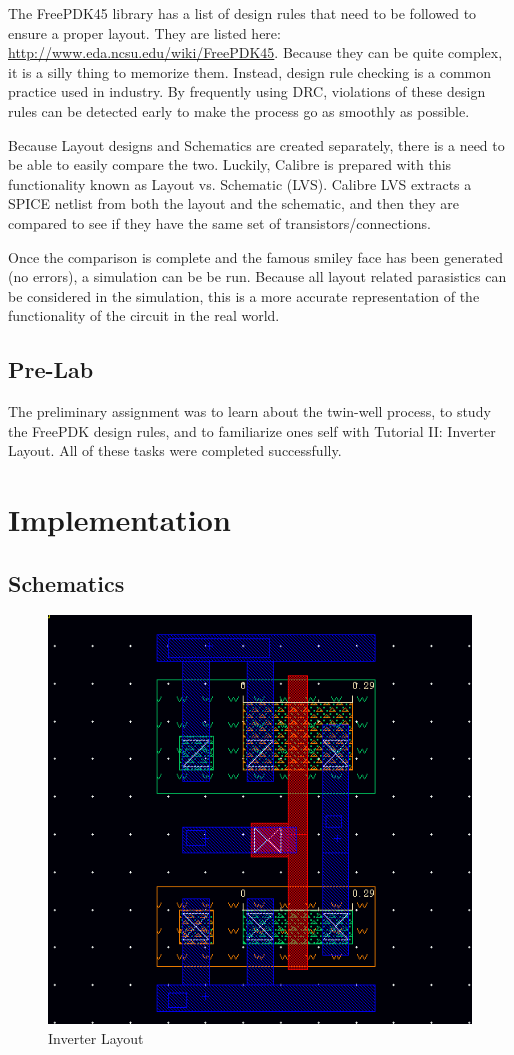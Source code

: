 \documentclass[12pt]{article}
\begin{document}
The FreePDK45 library has a list of design rules that need to be followed to ensure a proper layout. They are listed here: \url{http://www.eda.ncsu.edu/wiki/FreePDK45}. Because they can be quite complex, it is a silly thing to memorize them. Instead, design rule checking is a common practice used in industry. By frequently using DRC, violations of these design rules can be detected early to make the process go as smoothly as possible.

Because Layout designs and Schematics are created separately, there is a need to be able to easily compare the two. Luckily, Calibre is prepared with this functionality known as Layout vs. Schematic (LVS). Calibre LVS extracts a SPICE netlist from both the layout and the schematic, and then they are compared to see if they have the same set of transistors/connections.

Once the comparison is complete and the famous smiley face has been generated (no errors), a simulation can be be run. Because all layout related parasistics can be considered in the simulation, this is a more accurate representation of the functionality of the circuit in the real world. 
\subsection{Pre-Lab}
The preliminary assignment was to learn about the twin-well process, to study the FreePDK design rules, and to familiarize ones self with Tutorial II: Inverter Layout. All of these tasks were completed successfully.
\section{Implementation}
\subsection{Schematics}
\begin{figure}[H]
\centering
\includegraphics[width=1\linewidth]{layout}
\caption{Inverter Layout}
\label{fig:layout}
\end{figure}
\end{document}
